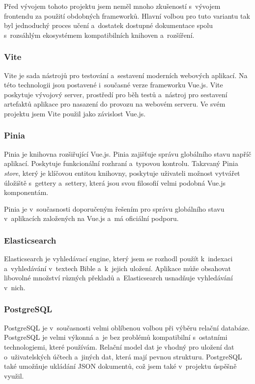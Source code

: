 \documentclass[
  tables=false,
  glossaries,
  index
]{kidiplom}
\begin{document}
Před vývojem tohoto projektu jsem neměl mnoho zkušeností s~vývojem frontendu za použití obdobných frameworků. Hlavní volbou pro tuto variantu tak byl jednoduchý proces učení a~dostatek dostupné dokumentace spolu s~rozsáhlým ekosystémem kompatibilních knihoven a~rozšíření.

\subsubsection{Vite}
Vite\cite{vite} je sada nástrojů pro testování a~sestavení moderních webových aplikací. Na této technologii jsou postavené i~současné verze frameworku Vue.js. Vite poskytuje vývojový server, prostředí pro běh testů a~nástroj pro sestavení artefaktů aplikace pro nasazení do provozu na webovém serveru. Ve svém projektu jsem Vite použil jako závislost Vue.js.

\subsubsection{Pinia}
Pinia\cite{pinia} je knihovna rozšiřující Vue.js. Pinia zajišťuje správu globálního stavu napříč aplikací. Poskytuje funkcionální rozhraní a~typovou kontrolu. Takzvaný Pinia \emph{store}, který je klíčovou entitou knihovny, poskytuje uživateli možnost vytvářet úložiště s~gettery a~settery, která jsou svou filosofií velmi podobná Vue.js komponentám.

Pinia je v~současnosti doporučeným řešením pro správu globálního stavu v~aplikacích založených na Vue.js a~má oficiální podporu.
\subsubsection{Elasticsearch}
Elasticsearch\cite{elasticsearch} je vyhledávací engine, který jsem se rozhodl použít k~indexaci a~vyhledávání v~textech Bible a~k~jejich uložení. Aplikace může obsahovat libovolné množství různých překladů a~Elasticsearch usnadňuje vyhledávání v~nich.

\subsubsection{PostgreSQL}
PostgreSQL\cite{postgresql} je v~současnosti velmi oblíbenou volbou při výběru relační databáze. PostgreSQL je velmi výkonná a~je bez problémů kompatibilní s~ostatními technologiemi, které používám. Relační model dat je vhodný pro uložení dat o~uživatelských účtech a~jiných dat, která mají pevnou strukturu. PostgreSQL také umožňuje ukládání JSON dokumentů, což jsem také v~projektu úspěšně využil.
\end{document}
